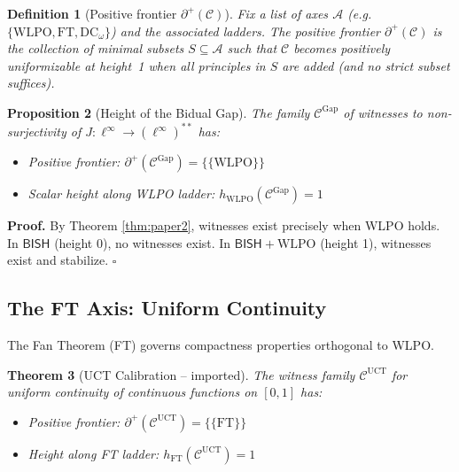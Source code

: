 \documentclass[11pt]{article}
\newtheorem{theorem}{Theorem}[section]
\newtheorem{definition}[theorem]{Definition}
\newtheorem{proposition}[theorem]{Proposition}
\newenvironment{proof}[1][Proof]{\noindent\textbf{#1.}\hspace{0.5em}}{\hfill$\square$\par}
\newcommand{\WLPO}{\mathrm{WLPO}}
\newcommand{\FT}{\mathrm{FT}}
\newcommand{\DCw}{\mathrm{DC}_\omega}
\newcommand{\BISH}{\mathsf{BISH}}
\newcommand{\linf}{\ell^\infty}
\newcommand{\Frontierpos}{\partial^{+}}
\newcommand{\UCT}{\mathrm{UCT}}
\begin{document}
\begin{definition}[Positive frontier $\Frontierpos(\mathcal{C})$]
Fix a list of axes $\mathcal{A}$ (e.g. $\{\WLPO,\FT,\DCw\}$) and the associated ladders.
The \emph{positive frontier} $\Frontierpos(\mathcal{C})$ is the collection of \emph{minimal}
subsets $S\subseteq\mathcal{A}$ such that $\mathcal{C}$ becomes positively uniformizable
at height~1 when all principles in $S$ are added (and no strict subset suffices).
\end{definition}

\begin{proposition}[Height of the Bidual Gap]
The family $\mathcal{C}^{\text{Gap}}$ of witnesses to non-surjectivity of $J: \linf \to (\linf)^{**}$ has:
\begin{itemize}
\item Positive frontier: $\Frontierpos(\mathcal{C}^{\text{Gap}}) = \{\{\WLPO\}\}$
\item Scalar height along WLPO ladder: $h_{\WLPO}(\mathcal{C}^{\text{Gap}}) = 1$
\end{itemize}
\end{proposition}

\begin{proof}
By Theorem \ref{thm:paper2}, witnesses exist precisely when WLPO holds. In $\BISH$ (height 0), no witnesses exist. In $\BISH + \WLPO$ (height 1), witnesses exist and stabilize.
\end{proof}

\subsection{The FT Axis: Uniform Continuity}

The Fan Theorem (FT) governs compactness properties orthogonal to WLPO.

\begin{theorem}[UCT Calibration -- imported]\label{thm:uct-calib}
The witness family $\mathcal{C}^{\UCT}$ for uniform continuity of continuous functions on $[0,1]$ has:
\begin{itemize}
\item Positive frontier: $\Frontierpos(\mathcal{C}^{\UCT}) = \{\{\FT\}\}$
\item Height along FT ladder: $h_{\FT}(\mathcal{C}^{\UCT}) = 1$
\end{itemize}
\end{theorem}
\end{document}
